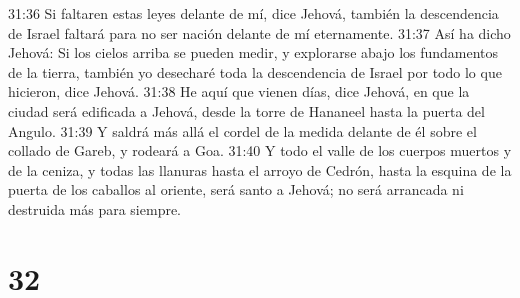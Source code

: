 31:36 Si faltaren estas leyes delante de mí, dice Jehová, también la descendencia de Israel faltará para no ser nación delante de mí eternamente.  
31:37 Así ha dicho Jehová: Si los cielos arriba se pueden medir, y explorarse abajo los fundamentos de la tierra, también yo desecharé toda la descendencia de Israel por todo lo que hicieron, dice Jehová.  
31:38 He aquí que vienen días, dice Jehová, en que la ciudad será edificada a Jehová, desde la torre de Hananeel hasta la puerta del Angulo.  
31:39 Y saldrá más allá el cordel de la medida delante de él sobre el collado de Gareb, y rodeará a Goa.  
31:40 Y todo el valle de los cuerpos muertos y de la ceniza, y todas las llanuras hasta el arroyo de Cedrón, hasta la esquina de la puerta de los caballos al oriente, será santo a Jehová; no será arrancada ni destruida más para siempre.  

\chapter{32}

